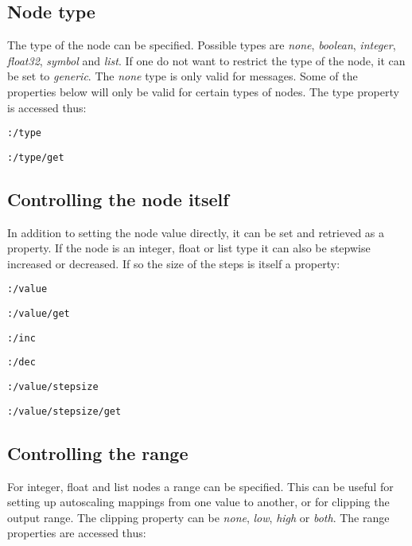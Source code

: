 \documentclass{NIME-alternate}
\begin{document}

\subsection{Node type} %
\label{sub:type}

The type of the node can be specified. Possible types are \emph{none}, \emph{boolean}, \emph{integer}, \emph{float32}, \emph{symbol} and \emph{list}. If one do not want to restrict the type of the node, it can be set to \emph{generic}. The \emph{none} type is only valid for messages. Some of the properties below will only be valid for certain types of nodes. The type property is accessed thus:

\texttt{:/type}

\texttt{:/type/get}





\subsection{Controlling the node itself} %
\label{sub:controlling_the_node_itself}

In addition to setting the node value directly, it can be set and retrieved as a property. If the node is an integer, float or list type it can also be stepwise increased or decreased. If so the size of the steps is itself a property:

\texttt{:/value}

\texttt{:/value/get}

\texttt{:/inc}

\texttt{:/dec} 

\texttt{:/value/stepsize}

\texttt{:/value/stepsize/get}





\subsection{Controlling the range} %
\label{sub:range}

For integer, float and list nodes a range can be specified. This can be useful for setting up autoscaling mappings from one value to another, or for clipping the output range. The clipping property can be \emph{none}, \emph{low}, \emph{high} or \emph{both}. The range properties are accessed thus:
\end{document}
